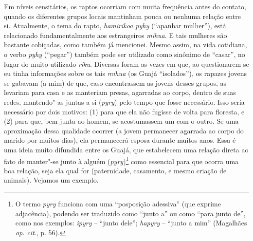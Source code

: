 Em níveis censitários, os raptos ocorriam com muita frequência antes do
contato, quando os diferentes grupos locais mantinham pouca ou nenhuma
relação entre si. Atualmente, o tema do rapto, \emph{hamirikoa pyhy}
(``apanhar mulher''), está relacionado fundamentalmente aos estrangeiros
\emph{mihua}. E tais mulheres são bastante cobiçadas, como também já
mencionei. Mesmo assim, na vida cotidiana, o verbo \emph{pyhy} (``pegar'')
também pode ser utilizado como sinônimo de ``casar'', no lugar do muito
utilizado \emph{riku}. Diversas foram as vezes em que, ao questionarem
se eu tinha informações sobre os tais \emph{mihua} (os Guajá
``isolados''), os rapazes jovens se gabavam (a mim) de que, caso
encontrassem as jovens desses grupos, as levariam para casa e as
manteriam presas, agarradas ao corpo, dentro de suas redes, mantendo"-as
juntas a si (\emph{pyry}) pelo tempo que fosse necessário. Isso seria
necessário por dois motivos: (1) para que ela não fugisse de volta para
floresta, e (2) para que, bem junta ao homem, se acostumassem um com o
outro. Se uma aproximação dessa qualidade ocorrer (a jovem permanecer
agarrada ao corpo do marido por muitos dias), ela permanecerá esposa
durante muitos anos. Essa é uma ideia muito difundida entre os Guajá,
que estabelecem uma relação direta ao fato de manter"-se junto à alguém
(\emph{pyry})\footnote{O termo \emph{pyry} funciona com uma ``posposição
  adessiva'' (que exprime adjacência), podendo ser traduzido como ``junto
  a'' ou como ``para junto de'', como nos exemplos: \emph{ipyry} -- ``junto
  dele''; \emph{hapyry} -- ``junto a mim'' (Magalhães \emph{op. cit}., p. 56).} como
essencial para que ocorra uma boa relação, seja ela qual for
(paternidade, casamento, e mesmo criação de animais). Vejamos um
exemplo.

